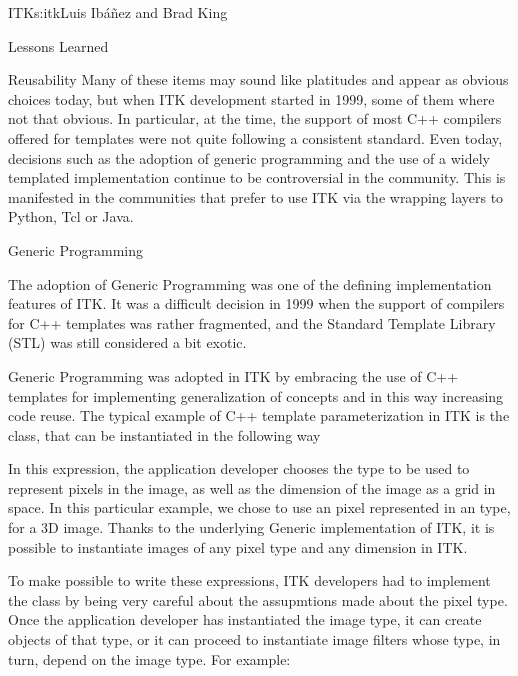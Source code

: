 \begin{aosachapter}{ITK}{s:itk}{Luis Ib\'{a}\~{n}ez and Brad King}
\begin{aosasect1}{Lessons Learned}
\begin{aosasect2}{Reusability}
Many of these items may sound like platitudes and appear as obvious choices
today, but when ITK development started in 1999, some of them where not that
obvious. In particular, at the time, the support of most C++ compilers offered
for templates were not quite following a consistent standard. Even today,
decisions such as the adoption of generic programming and the use of a widely
templated implementation continue to be controversial in the community. This is
manifested in the communities that prefer to use ITK via the wrapping layers to
Python, Tcl or Java.


\begin{aosasect3}{Generic Programming}

The adoption of Generic Programming was one of the defining implementation
features of ITK. It was a difficult decision in 1999 when the support of
compilers for C++ templates was rather fragmented, and the Standard Template
Library (STL) was still considered a bit exotic.

Generic Programming was adopted in ITK by embracing the use of C++ templates
for implementing generalization of concepts and in this way increasing code
reuse. The typical example of C++ template parameterization in ITK is the
 class, that can be instantiated in the following way

\begin{aosaitemize}
\item {}
\item {}
\item {}
\item {}
\end{aosaitemize}

In this expression, the application developer chooses the type to be used to
represent pixels in the image, as well as the dimension of the image as a grid
in space. In this particular example, we chose to use an  pixel
represented in an  type, for a 3D image. Thanks to the
underlying Generic implementation of ITK, it is possible to instantiate images
of any pixel type and any dimension in ITK.

To make possible to write these expressions, ITK developers had to implement
the  class by being very careful about the assupmtions made about
the pixel type.  Once the application developer has instantiated the image
type, it can create objects of that type, or it can proceed to instantiate
image filters whose type, in turn, depend on the image type.  For example:


\end{aosasect3}
\end{aosasect2}
\end{aosasect1}
\end{aosachapter}
